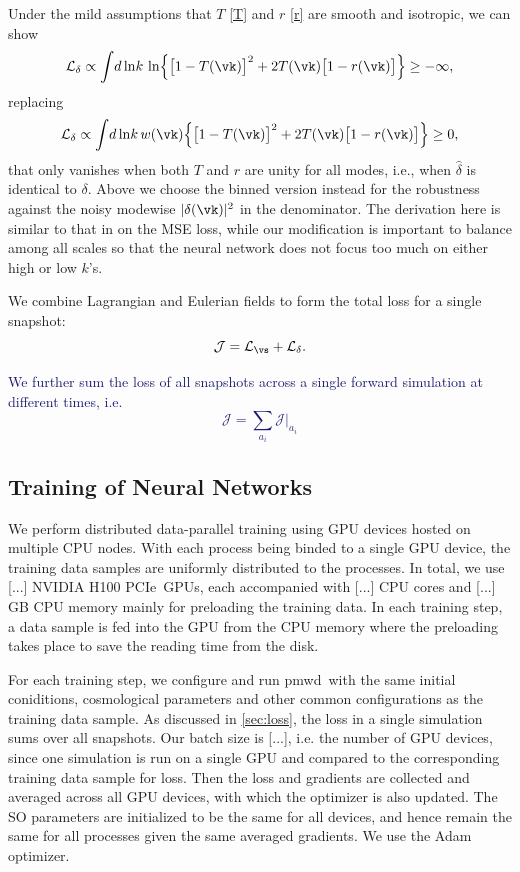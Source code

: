 \documentclass[modern, trackchanges, dvipsnames]{aastex631}
\newcommand{\pmwd}{{\usefont{T1}{nova}{m}{sl}pmwd}}
\renewcommand{\d}{d}
\newcommand{\cJ}{\mathcal{J}}
\newcommand{\cL}{\mathcal{L}}
\newcommand{\GPU}{NVIDIA H100 PCIe}  %
\newcommand{\YZ}[1]{\textcolor{MidnightBlue}{#1}}
\begin{document}
Under the mild assumptions that $T$ \eqref{T} and $r$ \eqref{r} are smooth
and isotropic, we can show
%
\begin{equation}
\cL_\delta \propto \int \!\d\ln\!k\, \ln
\Bigl\{ \bigl[ 1 - T(\vk) \bigr]^2
  + 2 T(\vk) \bigl[ 1 - r(\vk) \bigr] \Bigr\} \geq -\infty,
\end{equation}
%
replacing
%
\begin{equation}
\cL_\delta \propto \int \!\d\ln\!k\, w(\vk)
\Bigl\{ \bigl[ 1 - T(\vk) \bigr]^2
  + 2 T(\vk) \bigl[ 1 - r(\vk) \bigr] \Bigr\} \geq 0,
\end{equation}
%
that only vanishes when both $T$ and $r$ are unity for all modes, i.e.,
when $\hat\delta$ is identical to $\delta$.
Above we choose the binned version instead for the robustness against
the noisy modewise $|\delta(\vk)|^2$ in the denominator.
The derivation here is similar to that in \citet{HeEtAl2019} on the MSE
loss, while our modification is important to balance among all scales so
that the neural network does not focus too much on either high or low
$k$'s.

We combine Lagrangian and Eulerian fields to form the total loss for a
single snapshot:
%
\begin{equation}
\cJ = \cL_\vs + \cL_\delta.
\end{equation}
%

\YZ{We further sum the loss of all snapshots across a single forward
simulation at different times, i.e.
\begin{equation}
\cJ = \sum_{a_i} \cJ |_{a_i}
\end{equation}
}


\vspace{1em}
\subsection{Training of Neural Networks}

We perform distributed data-parallel training using GPU devices hosted
on multiple CPU nodes.
With each process being binded to a single GPU device, the training data
samples are uniformly distributed to the processes.
In total, we use [...] \GPU\ GPUs, each accompanied with [...] CPU cores
and [...] GB CPU memory mainly for preloading the training data.
In each training step, a data sample is fed into the GPU from the CPU
memory where the preloading takes place to save the reading time from
the disk.

For each training step, we configure and run \pmwd\ with the same
initial coniditions, cosmological parameters and other common
configurations as the training data sample.
As discussed in \autoref{sec:loss}, the loss in a single simulation sums
over all snapshots.
Our batch size is [...], i.e. the number of GPU devices, since one
simulation is run on a single GPU and compared to the corresponding
training data sample for loss.
Then the loss and gradients are collected and averaged across all GPU
devices, with which the optimizer is also updated.
The SO parameters are initialized to be the same for all devices, and
hence remain the same for all processes given the same averaged
gradients.
We use the Adam \citep{Adam} optimizer.
\end{document}

